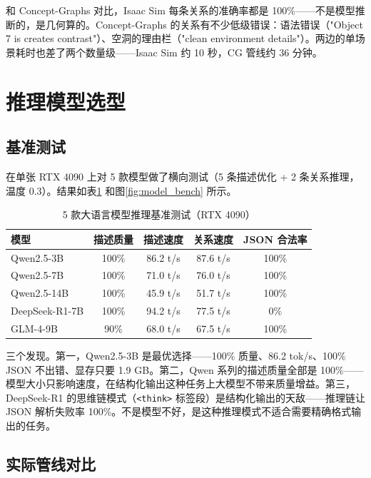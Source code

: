 和 Concept-Graphs 对比，Isaac Sim 每条关系的准确率都是 100\%——不是模型推断的，是几何算的。Concept-Graphs 的关系有不少低级错误：语法错误（"Object 7 is creates contrast"）、空洞的理由栏（"clean environment details"）。两边的单场景耗时也差了两个数量级——Isaac Sim 约 10 秒，CG 管线约 36 分钟。

\section{推理模型选型}

\subsection{基准测试}

在单张 RTX 4090 上对 5 款模型做了横向测试（5 条描述优化 + 2 条关系推理，温度 0.3）。结果如表\ref{tab:model_benchmark} 和图\ref{fig:model_bench} 所示。

\begin{table}[H]
\centering
\caption{5 款大语言模型推理基准测试（RTX 4090）}
\label{tab:model_benchmark}
\begin{tabular}{lcccc}
\toprule
\textbf{模型} & \textbf{描述质量} & \textbf{描述速度} & \textbf{关系速度} & \textbf{JSON 合法率} \\
\midrule
Qwen2.5-3B & 100\% & 86.2 t/s & 87.6 t/s & 100\% \\
Qwen2.5-7B & 100\% & 71.0 t/s & 76.0 t/s & 100\% \\
Qwen2.5-14B & 100\% & 45.9 t/s & 51.7 t/s & 100\% \\
DeepSeek-R1-7B & 100\% & 94.2 t/s & 77.5 t/s & 0\% \\
GLM-4-9B & 90\% & 68.0 t/s & 67.5 t/s & 100\% \\
\bottomrule
\end{tabular}
\end{table}



三个发现。第一，Qwen2.5-3B 是最优选择——100\% 质量、86.2 tok/s、100\% JSON 不出错、显存只要 1.9 GB。第二，Qwen 系列的描述质量全部是 100\%——模型大小只影响速度，在结构化输出这种任务上大模型不带来质量增益。第三，DeepSeek-R1 的思维链模式（\texttt{<think>} 标签段）是结构化输出的天敌——推理链让 JSON 解析失败率 100\%。不是模型不好，是这种推理模式不适合需要精确格式输出的任务。

\subsection{实际管线对比}


